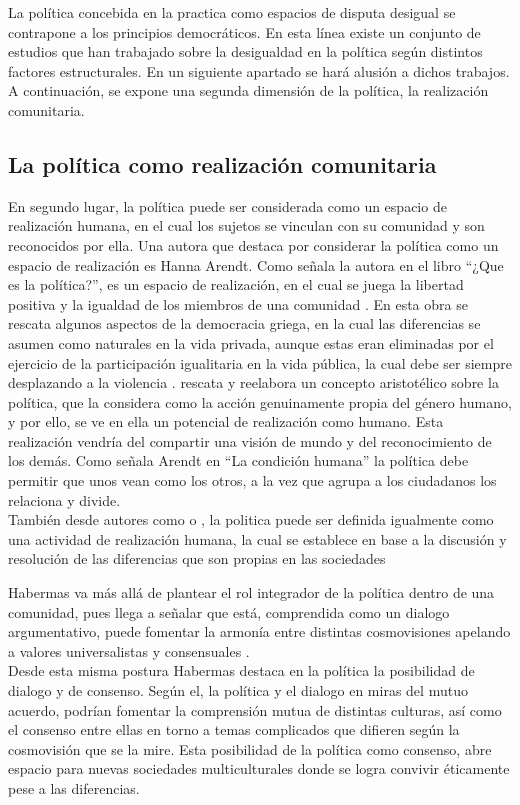 \documentclass[12pt,twoside]{templates/facsothesis}
\begin{document}
La política concebida en la practica como espacios de disputa desigual se contrapone a los principios democráticos. En esta línea existe un conjunto de estudios que han trabajado sobre la desigualdad en la política según distintos factores estructurales. En un siguiente apartado se hará alusión a dichos trabajos. A continuación, se expone una segunda dimensión de la política, la realización comunitaria.

\hypertarget{la-poluxedtica-como-realizaciuxf3n-comunitaria}{%
\subsection{La política como realización comunitaria}\label{la-poluxedtica-como-realizaciuxf3n-comunitaria}}

En segundo lugar, la política puede ser considerada como un espacio de realización humana, en el cual los sujetos se vinculan con su comunidad y son reconocidos por ella. Una autora que destaca por considerar la política como un espacio de realización es Hanna Arendt. Como señala la autora en el libro ``¿Que es la política?'', es un espacio de realización, en el cual se juega la libertad positiva y la igualdad de los miembros de una comunidad \citep{arendt_Que_2009}. En esta obra se rescata algunos aspectos de la democracia griega, en la cual las diferencias se asumen como naturales en la vida privada, aunque estas eran eliminadas por el ejercicio de la participación igualitaria en la vida pública, la cual debe ser siempre desplazando a la violencia \citep{goveacabrera_Vision_2010}. \citet{arendt_Que_2009} rescata y reelabora un concepto aristotélico sobre la política, que la considera como la acción genuinamente propia del género humano, y por ello, se ve en ella un potencial de realización como humano. Esta realización vendría del compartir una visión de mundo y del reconocimiento de los demás. Como señala Arendt en ``La condición humana'' la política debe permitir que unos vean como los otros, a la vez que agrupa a los ciudadanos los relaciona y divide.\\
También desde autores como \citet{lechner_conflictiva_1984} o \citet{mouffe_retorno_1999}, la politica puede ser definida igualmente como una actividad de realización humana, la cual se establece en base a la discusión y resolución de las diferencias que son propias en las sociedades

Habermas va más allá de plantear el rol integrador de la política dentro de una comunidad, pues llega a señalar que está, comprendida como un dialogo argumentativo, puede fomentar la armonía entre distintas cosmovisiones apelando a valores universalistas y consensuales \citep{habermas_etica_2006}.\\
Desde esta misma postura Habermas destaca en la política la posibilidad de dialogo y de consenso. Según el, la política y el dialogo en miras del mutuo acuerdo, podrían fomentar la comprensión mutua de distintas culturas, así como el consenso entre ellas en torno a temas complicados que difieren según la cosmovisión que se la mire. Esta posibilidad de la política como consenso, abre espacio para nuevas sociedades multiculturales donde se logra convivir éticamente pese a las diferencias.
\end{document}
